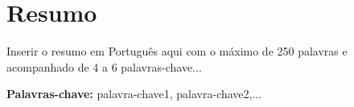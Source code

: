 
\section*{Resumo}


Inserir o resumo em Portugu\^{e}s aqui com o máximo de 250 palavras e acompanhado de 4 a 6 palavras-chave...

\vfill

\textbf{\Large Palavras-chave:} palavra-chave1, palavra-chave2,...

